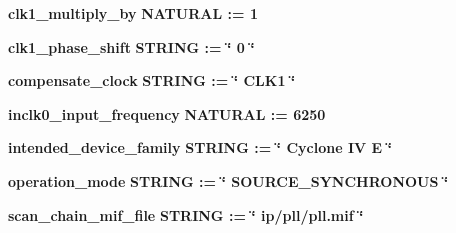 \begin{DoxyCompactItemize}
\item 
{\bf clk1\+\_\+multiply\+\_\+by} {\bfseries {\bfseries \textcolor{comment}{N\+A\+T\+U\+R\+AL}\textcolor{vhdlchar}{ }\textcolor{vhdlchar}{ }\textcolor{vhdlchar}{\+:}\textcolor{vhdlchar}{=}\textcolor{vhdlchar}{ }\textcolor{vhdlchar}{ } \textcolor{vhdldigit}{1} \textcolor{vhdlchar}{ }}}
\item 
{\bf clk1\+\_\+phase\+\_\+shift} {\bfseries {\bfseries \textcolor{comment}{S\+T\+R\+I\+NG}\textcolor{vhdlchar}{ }\textcolor{vhdlchar}{ }\textcolor{vhdlchar}{\+:}\textcolor{vhdlchar}{=}\textcolor{vhdlchar}{ }\textcolor{vhdlchar}{ }\textcolor{vhdlchar}{ }\textcolor{vhdlchar}{ }\textcolor{keyword}{\char`\"{} 0 \char`\"{}}\textcolor{vhdlchar}{ }}}
\item 
{\bf compensate\+\_\+clock} {\bfseries {\bfseries \textcolor{comment}{S\+T\+R\+I\+NG}\textcolor{vhdlchar}{ }\textcolor{vhdlchar}{ }\textcolor{vhdlchar}{\+:}\textcolor{vhdlchar}{=}\textcolor{vhdlchar}{ }\textcolor{vhdlchar}{ }\textcolor{vhdlchar}{ }\textcolor{vhdlchar}{ }\textcolor{keyword}{\char`\"{} C\+L\+K1 \char`\"{}}\textcolor{vhdlchar}{ }}}
\item 
{\bf inclk0\+\_\+input\+\_\+frequency} {\bfseries {\bfseries \textcolor{comment}{N\+A\+T\+U\+R\+AL}\textcolor{vhdlchar}{ }\textcolor{vhdlchar}{ }\textcolor{vhdlchar}{\+:}\textcolor{vhdlchar}{=}\textcolor{vhdlchar}{ }\textcolor{vhdlchar}{ } \textcolor{vhdldigit}{6250} \textcolor{vhdlchar}{ }}}
\item 
{\bf intended\+\_\+device\+\_\+family} {\bfseries {\bfseries \textcolor{comment}{S\+T\+R\+I\+NG}\textcolor{vhdlchar}{ }\textcolor{vhdlchar}{ }\textcolor{vhdlchar}{\+:}\textcolor{vhdlchar}{=}\textcolor{vhdlchar}{ }\textcolor{vhdlchar}{ }\textcolor{vhdlchar}{ }\textcolor{vhdlchar}{ }\textcolor{keyword}{\char`\"{} Cyclone I\+V E \char`\"{}}\textcolor{vhdlchar}{ }}}
\item 
{\bf operation\+\_\+mode} {\bfseries {\bfseries \textcolor{comment}{S\+T\+R\+I\+NG}\textcolor{vhdlchar}{ }\textcolor{vhdlchar}{ }\textcolor{vhdlchar}{\+:}\textcolor{vhdlchar}{=}\textcolor{vhdlchar}{ }\textcolor{vhdlchar}{ }\textcolor{vhdlchar}{ }\textcolor{vhdlchar}{ }\textcolor{keyword}{\char`\"{} S\+O\+U\+R\+C\+E\+\_\+\+S\+Y\+N\+C\+H\+R\+O\+N\+O\+U\+S \char`\"{}}\textcolor{vhdlchar}{ }}}
\item 
{\bf scan\+\_\+chain\+\_\+mif\+\_\+file} {\bfseries {\bfseries \textcolor{comment}{S\+T\+R\+I\+NG}\textcolor{vhdlchar}{ }\textcolor{vhdlchar}{ }\textcolor{vhdlchar}{\+:}\textcolor{vhdlchar}{=}\textcolor{vhdlchar}{ }\textcolor{vhdlchar}{ }\textcolor{vhdlchar}{ }\textcolor{vhdlchar}{ }\textcolor{keyword}{\char`\"{} ip/pll/pll.\+mif \char`\"{}}\textcolor{vhdlchar}{ }}}

\end{DoxyCompactItemize}
